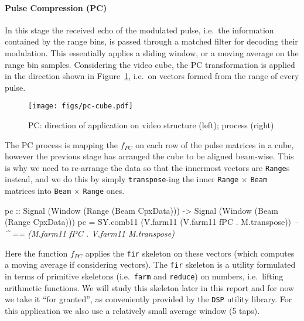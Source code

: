 \documentclass[
  a4paper,
]{article}
\newenvironment{Shaded}{}{}
\newcommand{\CommentTok}[1]{\textcolor[rgb]{0.38,0.63,0.69}{\textit{#1}}}
\newcommand{\DataTypeTok}[1]{\textcolor[rgb]{0.56,0.13,0.00}{#1}}
\newcommand{\FunctionTok}[1]{\textcolor[rgb]{0.02,0.16,0.49}{#1}}
\newcommand{\NormalTok}[1]{#1}
\newcommand{\OtherTok}[1]{\textcolor[rgb]{0.00,0.44,0.13}{#1}}
\let\oldparagraph\paragraph
\renewcommand{\paragraph}[1]{\oldparagraph{#1}\mbox{}}
\begin{document}
\hypertarget{sec:cube-pc-atom}{%
\paragraph{Pulse Compression (PC)}\label{sec:cube-pc-atom}}

In this stage the received echo of the modulated pulse, i.e.~the
information contained by the range bins, is passed through a matched
filter for decoding their modulation. This essentially applies a sliding
window, or a moving average on the range bin samples. Considering the
video cube, the PC transformation is applied in the direction shown in
Figure~\ref{fig:cube-pc-cube}, i.e.~on vectors formed from the range of
every pulse.

\begin{figure}
\hypertarget{fig:cube-pc-cube}{%
\centering
\texttt{[image: figs/pc-cube.pdf]}
\caption{PC: direction of application on video structure (left); process
(right)}\label{fig:cube-pc-cube}
}
\end{figure}

The PC process is mapping the \(f_{PC}\) on each row of the pulse
matrices in a cube, however the previous stage has arranged the cube to
be aligned beam-wise. This is why we need to re-arrange the data so that
the innermost vectors are \texttt{Range}s instead, and we do this by
simply \texttt{transpose}-ing the inner \texttt{Range} \(\times\)
\texttt{Beam} matrices into \texttt{Beam} \(\times\) \texttt{Range}
ones.

\begin{Shaded}
\begin{Highlighting}[numbers=left,,firstnumber=208,]
\OtherTok{pc ::} \DataTypeTok{Signal}\NormalTok{ (}\DataTypeTok{Window}\NormalTok{ (}\DataTypeTok{Range}\NormalTok{ (}\DataTypeTok{Beam}  \DataTypeTok{CpxData}\NormalTok{))) }
   \OtherTok{->} \DataTypeTok{Signal}\NormalTok{ (}\DataTypeTok{Window}\NormalTok{ (}\DataTypeTok{Beam}\NormalTok{  (}\DataTypeTok{Range} \DataTypeTok{CpxData}\NormalTok{)))}
\NormalTok{pc }\FunctionTok{=}\NormalTok{ SY.comb11 (V.farm11 (V.farm11 fPC }\FunctionTok{.}\NormalTok{ M.transpose))}
\CommentTok{--             ^ == (M.farm11 fPC . V.farm11 M.transpose)}
\end{Highlighting}
\end{Shaded}

Here the function \(f_{PC}\) applies the \texttt{fir} skeleton on these
vectors (which computes a moving average if considering vectors). The
\texttt{fir} skeleton is a utility formulated in terms of primitive
skeletons (i.e.~\texttt{farm} and \texttt{reduce}) on numbers,
i.e.~lifting arithmetic functions. We will study this skeleton later in
this report and for now we take it ``for granted'', as conveniently
provided by the \texttt{DSP} utility library. For this application we
also use a relatively small average window (5 taps).
\end{document}
